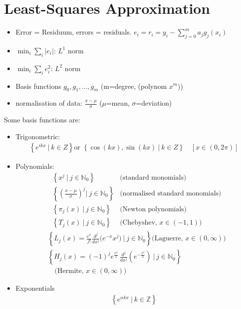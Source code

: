 \section{Least-Squares Approximation}

\begin{itemize}
	\item Error = Residuum, errors = residuals. $e_i=r_i=y_i - \sum_{j=0}^ma_jg_j(x_i)$
	\item $\min_i\sum_i|e_i|$: $L^1$ norm
	\item $\min_i\sum_ie_i^2$: $L^2$ norm
	\item Basis functions $g_0,g_1,\ldots,g_m$ (m=degree, (polynom $x^m$))
	\item normalisation of data: $\frac{x-\mu}{\sigma}$ ($\mu$=mean, $\sigma$=deviation)
\end{itemize}

Some basis functions are:
\begin{itemize}
	\item{
		Trigonometric:
		\begin{align*}
			\left\{e^{i k x}\ |\ k\in Z\right\}{\text{or }}\left\{{\cos(k x){\mathrm{,}}\sin(k x)\ |\ k\in Z}\right\}\quad[x\in(0,2\pi)]
		\end{align*}
	}
	\item{
		Polynomials:
		\begin{align*}
			& \left\{x^{j}\ |\ j\in \mathbb{N}_{0}\right\} & \text{(standard monomials)} \\
			& \left\{\left({\frac{x-\mu}{\sigma}}\right)^{j}|\ j\in \mathbb{N}_{0}\right\} & \text{(normalised standard monomials)} \\
			& \left\{ \pi_{j}(x)\ |\ j\in \mathbb{N}_{0} \right\} & \text{(Newton polynomials)} \\
			& \left\{T_{j}(x)\ |\ j\in \mathbb{N}_{0}\right\} & \text{(Chebyshev, }x\in(-1,1))
		\end{align*}
		\begin{align*}
			& \left\{L_{j}(x)=\frac{e^{x}}{j!}\frac{d^{j}}{d x^{j}}\Big(e^{-x}x^{j}\Big)\ |\ j\in \mathbb{N}_{0}\right\}
			\text{(Laguerre, }x\in(0,\infty)) \\
			& \left\{H_{j}(x)=(-1)^{j}e^{\frac{x^{2}}{2}}\,{\frac{d^{j}}{d x^{j}}}\left(e^{-\frac{x^{2}}{2}}\right)\ |\ j\in \mathbb{N}_{0}\right\} \\
			&\quad\text{(Hermite, }x\in(0,\infty))
		\end{align*}
	}
	\item{
		Exponentials
		\begin{align*}
			\left\{ e^{\alpha kx}\ |\ k\in\mathbb{Z} \right\}
		\end{align*}
	}
\end{itemize}

